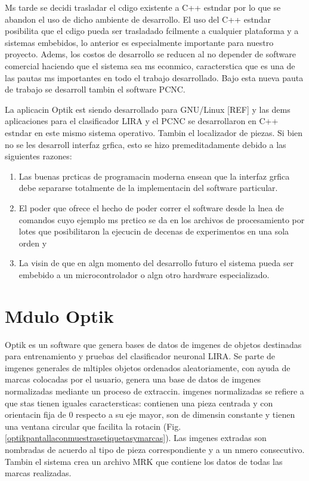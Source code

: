 Ms tarde se decidi trasladar el cdigo existente a C++ estndar por lo que se abandon el uso de dicho ambiente de desarrollo. El uso del C++ estndar posibilita que el cdigo pueda ser trasladado fcilmente a cualquier plataforma y a sistemas embebidos, lo anterior es especialmente importante para nuestro proyecto. Adems, los costos de desarrollo se reducen al no depender de software comercial haciendo que el sistema sea ms econmico, caracterstica que es una de las pautas ms importantes en todo el trabajo desarrollado. Bajo esta nueva pauta de trabajo se desarroll tambin el software PCNC.

La aplicacin Optik est siendo desarrollado para GNU/Linux [REF] y las dems aplicaciones para el clasificador LIRA y el PCNC se desarrollaron en C++ estndar en este mismo sistema operativo. Tambin el localizador de piezas. Si bien no se les desarroll interfaz grfica, esto se hizo premeditadamente debido a las siguientes razones: 

\begin{enumerate} 
\item Las buenas prcticas de programacin moderna ensean que la interfaz grfica debe separarse totalmente de la implementacin del software particular. 
\item El poder que ofrece el hecho de poder correr el software desde la lnea de comandos cuyo ejemplo ms prctico se da en los archivos de procesamiento por lotes que posibilitaron la ejecucin de decenas de experimentos en una sola orden y 
\item La visin de que en algn momento del desarrollo futuro el sistema pueda ser embebido a un microcontrolador o algn otro hardware especializado.
\end{enumerate} 

\section{Mdulo Optik}\label{sec:optik}
Optik es un software que genera bases de datos de imgenes de objetos
destinadas para entrenamiento y pruebas del clasificador neuronal
LIRA. Se parte de imgenes generales de mltiples objetos ordenados
aleatoriamente, con ayuda de marcas colocadas por el usuario, genera
una base de datos de imgenes normalizadas mediante un proceso de
extraccin. imgenes normalizadas se refiere a que stas tienen
iguales caractersticas: contienen una pieza centrada y con
orientacin fija de 0 respecto a su eje mayor, son de dimensin
constante y tienen una ventana circular que facilita la rotacin
(Fig. \ref{optikpantallaconmuestrasetiquetasymarcas}). Las imgenes extradas son nombradas de acuerdo al tipo de
pieza correspondiente y a un nmero consecutivo. Tambin el sistema
crea un archivo MRK que contiene los datos de todas las marcas
realizadas.

